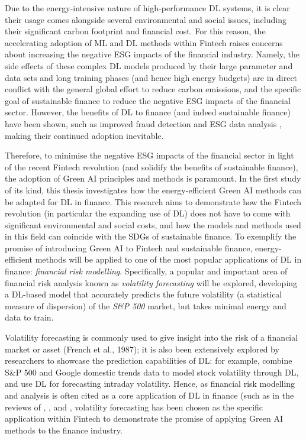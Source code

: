 \documentclass[a4paper, 11pt]{report}
\begin{document}
    Due to the energy-intensive nature of high-performance DL systems, it is clear their usage comes alongside several environmental and social issues, including their significant carbon footprint and financial cost. For this reason, the accelerating adoption of ML and DL methods within Fintech raises concerns about increasing the negative ESG impacts of the financial industry. Namely, the side effects of these complex DL models produced by their large parameter and data sets and long training phases (and hence high energy budgets) are in direct conflict with the general global effort to reduce carbon emissions, and the specific goal of sustainable finance to reduce the negative ESG impacts of the financial sector. However, the benefits of DL to finance (and indeed sustainable finance) have been shown, such as improved fraud detection \citep{sadgali-2019} and ESG data analysis \citep{mehra-2022}, making their continued adoption inevitable. 

    Therefore, to minimise the negative ESG impacts of the financial sector in light of the recent Fintech revolution (and solidify the benefits of sustainable finance), the adoption of Green AI principles and methods is paramount. In the first study of its kind, this thesis investigates how the energy-efficient Green AI methods can be adapted for DL in finance. This research aims to demonstrate how the Fintech revolution (in particular the expanding use of DL) does not have to come with significant environmental and social costs, and how the models and methods used in this field can coincide with the SDGs of sustainable finance. To exemplify the promise of introducing Green AI to Fintech and sustainable finance, energy-efficient methods will be applied to one of the most popular applications of DL in finance: \emph{financial risk modelling}. Specifically, a popular and important area of financial risk analysis known as \emph{volatility forecasting} will be explored, developing a DL-based model that accurately predicts the future volatility (a statistical measure of dispersion) of the \emph{S\&P 500} market, but takes minimal energy and data to train. 

    Volatility forecasting is commonly used to give insight into the risk of a financial market or asset (French et al., 1987); it is also been extensively explored by researchers to showcase the prediction capabilities of DL: for example, \citet{xiong-2015} combine S\&P 500 and Google domestic trends data to model stock volatility through DL, and \citet{zhang-2022} use DL for forecasting intraday volatility. Hence, as financial risk modelling and analysis is often cited as a core application of DL in finance (such as in the reviews of \citet{sezer-2019}, \citet{ozbayoglu-2020}, and \citet{thakkar-2021}, volatility forecasting has been chosen as the specific application within Fintech to demonstrate the promise of applying Green AI methods to the finance industry.
\end{document}

